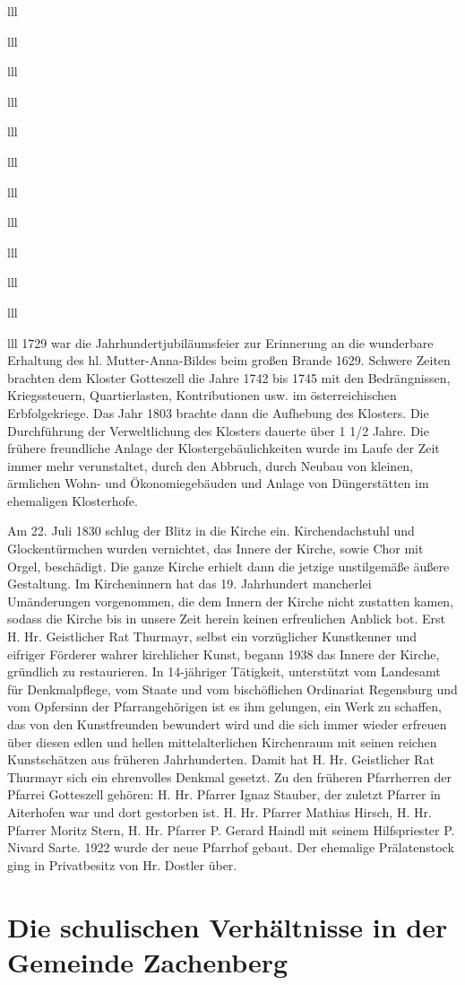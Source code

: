 \documentclass[12pt,a4pager]{book}
\begin{document}
\begin{tabuluar}{lll}
\begin{tabuluar}{lll}
\begin{tabuluar}{lll}
\begin{tabuluar}{lll}
\begin{tabuluar}{lll}
\begin{tabuluar}{lll}
\begin{tabuluar}{lll}
\begin{tabuluar}{lll}
\begin{tabuluar}{lll}
\begin{tabuluar}{lll}
\begin{tabuluar}{lll}
\begin{tabuluar}{lll}
1729 war die Jahrhundertjubiläumsfeier zur Erinnerung an die wunderbare
Erhaltung des hl. Mutter-Anna-Bildes beim großen Brande 1629. Schwere Zeiten
brachten dem Kloster Gotteszell die Jahre 1742 bis 1745 mit den Bedrängnissen,
Kriegssteuern, Quartierlasten, Kontributionen usw. im österreichischen
Erbfolgekriege. Das Jahr 1803 brachte dann die Aufhebung des Klosters. Die
Durchführung der Verweltlichung des Klosters dauerte über 1 1/2 Jahre. Die
frühere freundliche Anlage der Klostergebäulichkeiten wurde im Laufe der Zeit
immer mehr verunstaltet, durch den Abbruch, durch Neubau von kleinen, ärmlichen
Wohn- und Ökonomiegebäuden und Anlage von Düngerstätten im ehemaligen
Klosterhofe.

Am 22. Juli 1830 schlug der Blitz in die Kirche ein. Kirchendachstuhl und
Glockentürmchen wurden vernichtet, das Innere der Kirche, sowie Chor mit Orgel,
beschädigt. Die ganze Kirche erhielt dann die jetzige unstilgemäße äußere
Gestaltung. Im Kircheninnern hat das 19. Jahrhundert mancherlei Umänderungen
vorgenommen, die dem Innern der Kirche nicht zustatten kamen, sodass die Kirche
bis in unsere Zeit herein keinen erfreulichen Anblick bot. Erst H. Hr.
Geistlicher Rat Thurmayr, selbst ein vorzüglicher Kunstkenner und eifriger
Förderer wahrer kirchlicher Kunst, begann 1938 das Innere der Kirche, gründlich
zu restaurieren. In 14-jähriger Tätigkeit, unterstützt vom Landesamt für
Denkmalpflege, vom Staate und vom bischöflichen Ordinariat Regensburg und vom
Opfersinn der Pfarrangehörigen ist es ihm gelungen, ein Werk zu schaffen, das
von den Kunstfreunden bewundert wird und die sich immer wieder erfreuen über
diesen edlen und hellen mittelalterlichen Kirchenraum mit seinen reichen
Kunstschätzen aus früheren Jahrhunderten. Damit hat H. Hr. Geistlicher Rat
Thurmayr sich ein ehrenvolles Denkmal gesetzt. Zu den früheren Pfarrherren der
Pfarrei Gotteszell gehören: H. Hr. Pfarrer Ignaz Stauber, der zuletzt Pfarrer in
Aiterhofen war und dort gestorben ist. H. Hr. Pfarrer Mathias Hirsch, H. Hr.
Pfarrer Moritz Stern, H. Hr. Pfarrer P. Gerard Haindl mit seinem Hilfspriester
P. Nivard Sarte. 1922 wurde der neue Pfarrhof gebaut. Der ehemalige
Prälatenstock ging in Privatbesitz von Hr. Dostler über.

\section{Die schulischen Verhältnisse in der Gemeinde Zachenberg}


\end{tabuluar}
\end{tabuluar}
\end{tabuluar}
\end{tabuluar}
\end{tabuluar}
\end{tabuluar}
\end{tabuluar}
\end{tabuluar}
\end{tabuluar}
\end{tabuluar}
\end{tabuluar}
\end{tabuluar}
\end{document}
